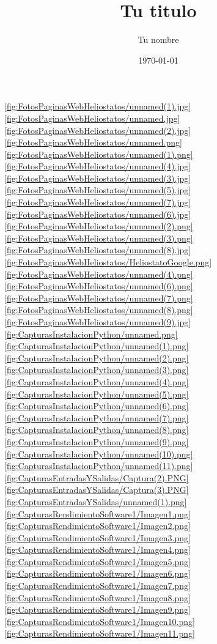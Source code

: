 \documentclass[12pt]{article}
\title{Tu titulo}					%
\author{Tu nombre}					%
\date{\today}						%
\begin{document}
\tableofcontents
\pagebreak








\ref{fig:FotosPaginasWebHeliostatos/unnamed(1).jpg}
\ref{fig:FotosPaginasWebHeliostatos/unnamed.jpg}
\ref{fig:FotosPaginasWebHeliostatos/unnamed(2).jpg}
\ref{fig:FotosPaginasWebHeliostatos/unnamed.png}
\ref{fig:FotosPaginasWebHeliostatos/unnamed(1).png}
\ref{fig:FotosPaginasWebHeliostatos/unnamed(4).jpg}
\ref{fig:FotosPaginasWebHeliostatos/unnamed(3).jpg}
\ref{fig:FotosPaginasWebHeliostatos/unnamed(5).jpg}
\ref{fig:FotosPaginasWebHeliostatos/unnamed(7).jpg}
\ref{fig:FotosPaginasWebHeliostatos/unnamed(6).jpg}
\ref{fig:FotosPaginasWebHeliostatos/unnamed(2).png}
\ref{fig:FotosPaginasWebHeliostatos/unnamed(3).png}
\ref{fig:FotosPaginasWebHeliostatos/unnamed(8).jpg}
\ref{fig:FotosPaginasWebHeliostatos/HeliostatoGoogle.png}
\ref{fig:FotosPaginasWebHeliostatos/unnamed(4).png}
\ref{fig:FotosPaginasWebHeliostatos/unnamed(6).png}
\ref{fig:FotosPaginasWebHeliostatos/unnamed(7).png}
\ref{fig:FotosPaginasWebHeliostatos/unnamed(8).png}
\ref{fig:FotosPaginasWebHeliostatos/unnamed(9).jpg}
\ref{fig:CapturasInstalacionPython/unnamed.png}
\ref{fig:CapturasInstalacionPython/unnamed(1).png}
\ref{fig:CapturasInstalacionPython/unnamed(2).png}
\ref{fig:CapturasInstalacionPython/unnamed(3).png}
\ref{fig:CapturasInstalacionPython/unnamed(4).png}
\ref{fig:CapturasInstalacionPython/unnamed(5).png}
\ref{fig:CapturasInstalacionPython/unnamed(6).png}
\ref{fig:CapturasInstalacionPython/unnamed(7).png}
\ref{fig:CapturasInstalacionPython/unnamed(8).png}
\ref{fig:CapturasInstalacionPython/unnamed(9).png}
\ref{fig:CapturasInstalacionPython/unnamed(10).png}
\ref{fig:CapturasInstalacionPython/unnamed(11).png}
\ref{fig:CapturasEntradasYSalidas/Captura(2).PNG}
\ref{fig:CapturasEntradasYSalidas/Captura(3).PNG}
\ref{fig:CapturasEntradasYSalidas/unnamed(1).png}
\ref{fig:CapturasRendimientoSoftware1/Imagen1.png}
\ref{fig:CapturasRendimientoSoftware1/Imagen2.png}
\ref{fig:CapturasRendimientoSoftware1/Imagen3.png}
\ref{fig:CapturasRendimientoSoftware1/Imagen4.png}
\ref{fig:CapturasRendimientoSoftware1/Imagen5.png}
\ref{fig:CapturasRendimientoSoftware1/Imagen6.png}
\ref{fig:CapturasRendimientoSoftware1/Imagen7.png}
\ref{fig:CapturasRendimientoSoftware1/Imagen8.png}
\ref{fig:CapturasRendimientoSoftware1/Imagen9.png}
\ref{fig:CapturasRendimientoSoftware1/Imagen10.png}
\ref{fig:CapturasRendimientoSoftware1/Imagen11.png}
\end{document}
